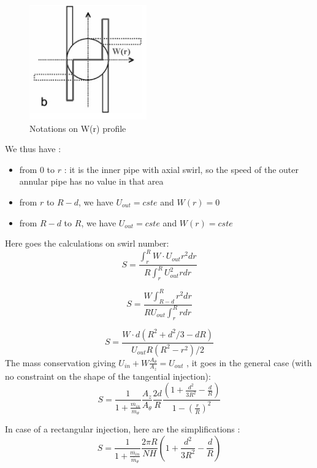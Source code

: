 \begin{figure}[h!]
  \centering
\includegraphics[width=0.45\textwidth]{fig/proto_W_profile.PNG}
  \caption{Notations on W(r) profile}
 \label{proto_profile}
\end{figure}
We thus have :
\begin{itemize}
\item from $0$ to $r$ : it is the inner pipe with axial swirl, so the speed of the outer annular pipe has no value in that area
\item from $r$ to $R-d$, we have $U_{out}=cste$ and $W(r)=0$
\item from $R-d$ to $R$, we have $U_{out}=cste$ and $W(r)=cste$
\end{itemize}



Here goes the calculations on swirl number:
\begin{equation}
S=\frac{\int_{r}^{R} W \cdot U_{out} r^2 dr}{R\int_{r}^{R}  U_{out}^2 r dr}
\end{equation}

\begin{equation}
S=\frac{W\int_{R-d}^{R} r^2dr}{R U_{out} \int_{r}^{R}  r dr}
\end{equation}

\begin{equation}\label{eq:S_proto_speed}
S=\frac{W \cdot d (R^2+d^2/3-dR)}{U_{out}R(R^2-r^2)/2}
\end{equation}
The mass conservation giving $U_{in}+W \frac{A_{\theta}}{A_{z}}=U_{out}$ , it goes in the general case (with no constraint on the shape of the tangential injection):
\begin{equation}
S=\frac{1}{1+\frac{\dot{m_{in}}}{\dot{m_{\theta}}}}\frac{A_{z}}{A_{\theta}}\frac{2d}{R}\frac{(1+\frac{d^2}{3R^2}-\frac{d}{R})}{1-(\frac{r}{R})^2}
\end{equation}


In case of a rectangular injection, here are the simplifications :
\begin{equation}
S=\frac{1}{1+\frac{\dot{m_{in}}}{\dot{m_{\theta}}}}\frac{2 \pi R}{NH}(1+\frac{d^2}{3R^2}-\frac{d}{R})
\end{equation}


